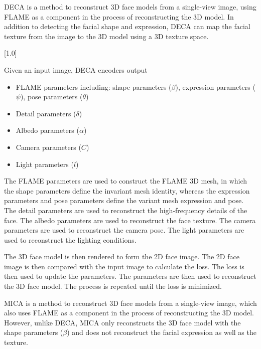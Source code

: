 

DECA \cite{fengLearningAnimatableDetailed2021} is a method to reconstruct 3D face models from a single-view image, using FLAME as a component in the process of reconstructing the 3D model. In addition to detecting the facial shape and expression, DECA can map the facial texture from the image to the 3D model using a 3D texture space.

[1.0]

Given an input image, DECA encoders output
\begin{itemize}
    \item FLAME parameters including: shape parameters ($\beta$), expression parameters ($\psi$), pose parameters ($\theta$)
    \item Detail parameters ($\delta $)
    \item Albedo parameters ($\alpha$)
    \item Camera parameters ($C$)
    \item Light parameters ($l$)
\end{itemize}

The FLAME parameters are used to construct the FLAME 3D mesh, in which the shape parameters define the invariant mesh identity, whereas the expression parameters and pose parameters define the variant mesh expression and pose. The detail parameters are used to reconstruct the high-frequency details of the face. The albedo parameters are used to reconstruct the face texture. The camera parameters are used to reconstruct the camera pose. The light parameters are used to reconstruct the lighting conditions.

The 3D face model is then rendered to form the 2D face image. The 2D face image is then compared with the input image to calculate the loss. The loss is then used to update the parameters. The parameters are then used to reconstruct the 3D face model. The process is repeated until the loss is minimized.


MICA \cite{zielonkaMetricalReconstructionHuman2022} is a method to reconstruct 3D face models from a single-view image, which also uses FLAME as a component in the process of reconstructing the 3D model. However, unlike DECA, MICA only reconstructs the 3D face model with the shape parameters ($\beta$) and does not reconstruct the facial expression as well as the texture.


